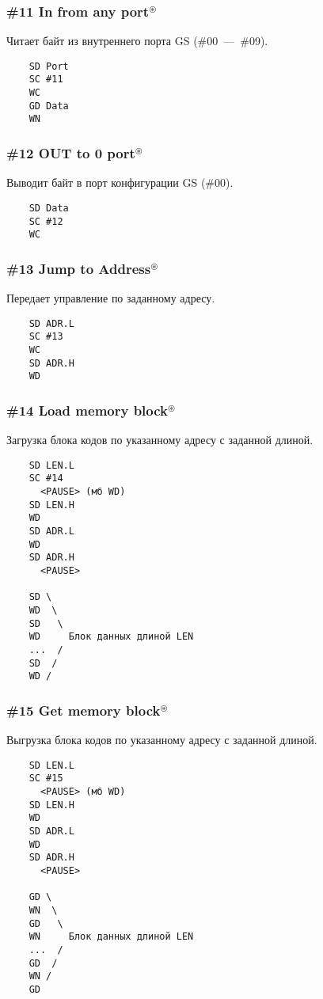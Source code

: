 \documentclass[a4paper,11pt]{article}
\DeclareRobustCommand{\Cyrax}{\texorpdfstring{\(^\circledast\)}{\circledast}}
\begin{document}
\subsubsection{\#11 In from any port\Cyrax}
Читает байт из внутреннего порта GS (\#00~---~\#09).
\begin{verbatim}
    SD Port
    SC #11
    WC
    GD Data
    WN
\end{verbatim}

\subsubsection{\#12 OUT to 0 port\Cyrax}
Выводит байт в порт конфигурации GS (\#00).
\begin{verbatim}
    SD Data
    SC #12
    WC
\end{verbatim}

\subsubsection{\#13 Jump to Address\Cyrax}
Передает управление по заданному адресу.
\begin{verbatim}
    SD ADR.L
    SC #13
    WC
    SD ADR.H
    WD
\end{verbatim}

\subsubsection{\#14 Load memory block\Cyrax}
Загрузка блока кодов по указанному адресу с заданной длиной.
\begin{verbatim}
    SD LEN.L
    SC #14
      <PAUSE> (мб WD)
    SD LEN.H
    WD
    SD ADR.L
    WD
    SD ADR.H
      <PAUSE>

    SD \
    WD  \
    SD   \
    WD     Блок данных длиной LEN
    ...  /
    SD  /
    WD /
\end{verbatim}

\subsubsection{\#15 Get memory block\Cyrax}
Выгрузка блока кодов по указанному адресу с заданной длиной.
\begin{verbatim}
    SD LEN.L
    SC #15
      <PAUSE> (мб WD)
    SD LEN.H
    WD
    SD ADR.L
    WD
    SD ADR.H
      <PAUSE>

    GD \
    WN  \
    GD   \
    WN     Блок данных длиной LEN
    ...  /
    GD  /
    WN /
    GD
\end{verbatim}
\end{document}
